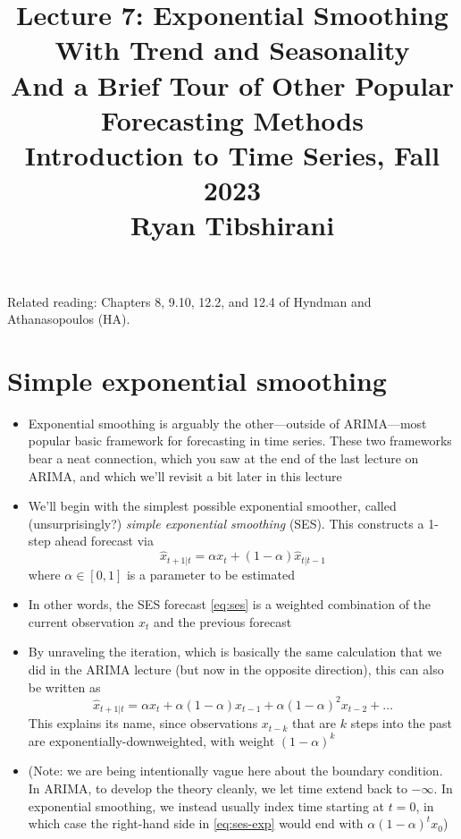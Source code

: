 \documentclass{article}
\title{Lecture 7: Exponential Smoothing With Trend and Seasonality \\ 
\Large And a Brief Tour of Other Popular Forecasting Methods \\ \smallskip
\large Introduction to Time Series, Fall 2023 \\ \smallskip
Ryan Tibshirani}
\date{}
\begin{document}
\maketitle
\RaggedRight
\vspace{-50pt}

Related reading: Chapters 8, 9.10, 12.2, and 12.4 of Hyndman and Athanasopoulos
(HA).

\section{Simple exponential smoothing}

\begin{itemize}
\item Exponential smoothing is arguably the other---outside of ARIMA---most 
  popular basic framework for forecasting in time series. These two frameworks
  bear a neat connection, which you saw at the end of the last lecture on ARIMA,
  and which we'll revisit a bit later in this lecture

\item We'll begin with the simplest possible exponential smoother, called
  (unsurprisingly?) \emph{simple exponential smoothing} (SES). This constructs 
  a 1-step ahead forecast via
  \begin{equation}
  \label{eq:ses}
  \hat{x}_{t+1 | t }= \alpha x_t + (1-\alpha) \hat{x}_{t | t-1}
  \end{equation}
  where $\alpha \in [0,1]$ is a parameter to be estimated

\item In other words, the SES forecast \eqref{eq:ses} is a weighted combination 
  of the current observation $x_t$ and the previous forecast  

\item By unraveling the iteration, which is basically the same calculation that
  we did in the ARIMA lecture (but now in the opposite direction), this can also
  be written as    
  \begin{equation}
  \label{eq:ses-exp}
  \hat{x}_{t+1 | t} = \alpha x_t + \alpha (1-\alpha) x_{t-1} + \alpha
  (1-\alpha)^2 x_{t-2} + \dots
  \end{equation}
  This explains its name, since observations $x_{t-k}$ that are $k$ steps into 
  the past are exponentially-downweighted, with weight $(1-\alpha)^k$  

\item  (Note: we are being intentionally vague here about the boundary 
  condition. In ARIMA, to develop the theory cleanly, we let time extend back to
  $-\infty$. In  exponential smoothing, we instead usually index time starting
  at $t = 0$, in which case the right-hand side in \eqref{eq:ses-exp} would end
  with $\alpha (1-\alpha)^t x_0$)


\end{itemize}
\end{document}
